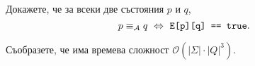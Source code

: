 \begin{problem}
  Докажете, че за всеки две състояния $p$ и $q$,
  \[p \equiv_{\mathcal{A}} q \ \Leftrightarrow\  \texttt{E[p][q] == true}.\]
\end{problem}

\begin{problem}
  Съобразете, че  има времева сложност $\mathcal{O}(|\Sigma| \cdot |Q|^3)$.
\end{problem}


